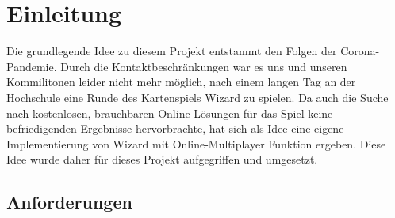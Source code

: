 \chapter{Einleitung}

Die grundlegende Idee zu diesem Projekt entstammt den Folgen der Corona-Pandemie. Durch die Kontaktbeschränkungen war es uns und unseren Kommilitonen leider nicht mehr möglich, nach einem langen Tag an der Hochschule eine Runde des Kartenspiels Wizard zu spielen. Da auch die Suche nach kostenlosen, brauchbaren Online-Lösungen für das Spiel keine befriedigenden Ergebnisse hervorbrachte, hat sich als Idee eine eigene Implementierung von Wizard mit Online-Multiplayer Funktion ergeben. Diese Idee wurde daher für dieses Projekt aufgegriffen und umgesetzt.

\section{Anforderungen}

